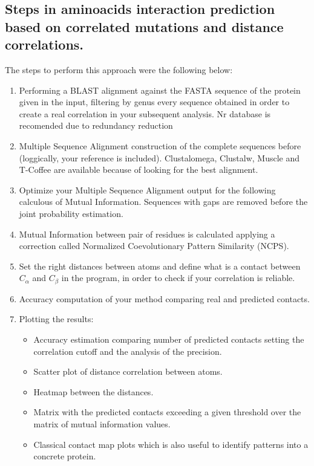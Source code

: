 \documentclass[12pt]{article}
\begin{document}
\subsection{Steps in aminoacids interaction prediction based on correlated mutations and distance correlations.}
The steps to perform this approach were the following below: 
\begin{enumerate} [i]
\item Performing a BLAST alignment against the FASTA sequence of the protein given in the input, filtering by genus \cite{Sato2003} every sequence obtained in order to create a real correlation in your subsequent analysis. Nr database is recomended due to redundancy reduction\cite{Jeong2012}
\item Multiple Sequence Alignment construction of the complete sequences before (loggically, your reference is included). Clustalomega, Clustalw, Muscle and T-Coffee are available because of looking for the best alignment.
\item Optimize your Multiple Sequence Alignment output for the following calculous of Mutual Information. Sequences with gaps are removed before the joint probability estimation.
\item Mutual Information between pair of residues is calculated applying a correction called Normalized Coevolutionary Pattern Similarity (NCPS)\cite{Lee2009}.
\item Set the right distances between atoms and define what is a contact between $C_{\alpha}$ and $C_{\beta}$ in the program, in order to check if your correlation is reliable.
\item Accuracy computation of your method comparing real and predicted contacts.
\item Plotting the results: 
	\begin{itemize}
		\item Accuracy estimation comparing number of predicted contacts setting the correlation cutoff and the analysis of the precision.
		\item Scatter plot of distance correlation between atoms.
		\item Heatmap between the distances.
		\item Matrix with the predicted contacts exceeding a given threshold over the matrix of mutual information values.
		\item Classical contact map plots which is also useful to identify patterns into a concrete protein.
	\end{itemize}
\end{enumerate}
\end{document}
